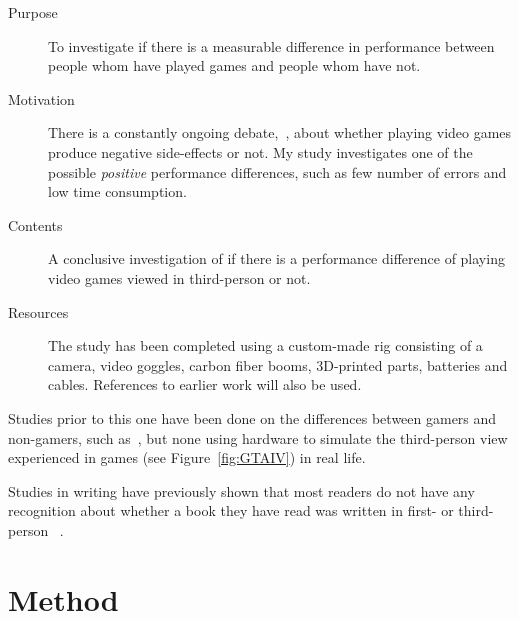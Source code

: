 \documentclass[runningheads,a4paper,oribibl]{llncs}
\begin{document}
\begin{description}
   \item[Purpose] To investigate if there is a measurable difference in performance between people whom have played games and people whom have not.
   \item[Motivation] There is a constantly ongoing debate,~\cite{valadez2012just}, about whether playing video games produce negative side-effects or not. My study investigates one of the possible \emph{positive} performance differences, such as few number of errors and low time consumption.
   \item[Contents] A conclusive investigation of if there is a performance difference of playing video games viewed in third-person or not.
   \item[Resources] The study has been completed using a custom-made rig consisting of a camera, video goggles, carbon fiber booms, 3D-printed parts, batteries and cables. References to earlier work will also be used.
\end{description}


Studies prior to this one have been done on the differences between gamers and non-gamers, such as~\cite{schmierbach2011exploring}, but none using hardware to simulate the third-person view experienced in games (see Figure~\ref{fig:GTAIV}) in real life. 

Studies in writing have previously shown that most readers do not have any recognition about whether a book they have read was written in first- or third-person ~\cite{hagg2012nya}. 













\section{Method}
\end{document}
